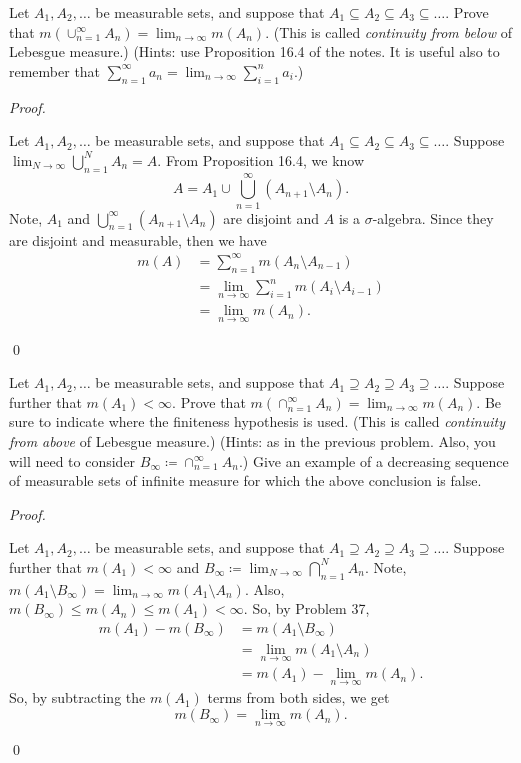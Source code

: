 \documentclass[12pt]{article}
\newenvironment{problem}[2][Problem]{\begin{trivlist}
\item[\hskip \labelsep {\bfseries #1}\hskip \labelsep {\bfseries
#2.}]}{\end{trivlist}}
\newenvironment{sol}
    {\emph{Proof.}
    }
    {
    \qed
    }
\begin{document}
  \begin{problem}{37}
    Let $A_1,A_2,\dots$ be measurable sets, and suppose that $A_1 \subseteq A_2 \subseteq A_3 \subseteq \dots$. Prove that $m(\cup _{n = 1}^{\infty}A_n) = \lim_{n \to \infty}m(A_n)$. (This is called \textit{continuity from below} of Lebesgue measure.) (Hints: use Proposition 16.4 of the notes. It is useful also to remember that $\sum_{n = 1}^{\infty}a_n = \lim_{n \to \infty}\sum_{i = 1}^{n}a_i$.)
  \end{problem}
  \begin{sol}
    Let $A_1,A_2,\dots$ be measurable sets, and suppose that $A_1 \subseteq A_2 \subseteq A_3 \subseteq \dots$. Suppose $\lim_{N \to \infty} \bigcup_{n = 1}^NA_n = A$. From Proposition 16.4, we know $$A = A_1 \cup \bigcup_{n = 1}^{\infty}(A_{n+1}  \setminus A_n).$$ Note, $A_1$ and $\bigcup_{n = 1}^{\infty}(A_{n+1}  \setminus A_n)$ are disjoint and $A$ is a $\sigma$-algebra. Since they are disjoint and measurable, then we have 
    \begin{align*}
      m(A) &= \sum_{n = 1}^{\infty}m(A_n \setminus A_{n-1}) \\
      &= \lim_{n \to \infty} \sum_{i = 1}^n m(A_i \setminus A_{i - 1}) \\
      &= \lim_{n \to \infty} m(A_n).
    \end{align*}
  \end{sol}
  
  \begin{problem}{38}
    Let $A_1,A_2,\dots$ be measurable sets, and suppose that $A_1 \supseteq A_2 \supseteq A_3 \supseteq \dots$. Suppose further that $m(A_1) < \infty$. Prove that $m(\cap_{n = 1}^{\infty}A_n) = \lim_{n \to \infty}m(A_n)$. Be sure to indicate where the finiteness hypothesis is used. (This is called \textit{continuity from above} of Lebesgue measure.) (Hints: as in the previous problem. Also, you will need to consider $B_{\infty} \coloneqq \cap_{n = 1}^{\infty}A_n$.) Give an example of a decreasing sequence of measurable sets of infinite measure for which the above conclusion is false. 
  \end{problem}
  \begin{sol}
    Let $A_1,A_2,\dots$ be measurable sets, and suppose that $A_1 \supseteq A_2 \supseteq A_3 \supseteq \dots$. Suppose further that $m(A_1) < \infty$ and $B_{\infty} \coloneqq \lim_{N \to \infty}\bigcap_{n = 1}^NA_n$. Note, $m(A_1 \setminus B_{\infty}) = \lim_{n \to \infty}m(A_1 \setminus A_n)$. Also, $m(B_{\infty}) \leq m(A_n) \leq m(A_1) < \infty$. So, by Problem 37, 
    \begin{align*}
      m(A_1) - m(B_{\infty}) &= m(A_1 \setminus B_{\infty}) \\
      &= \lim_{n \to \infty} m(A_1 \setminus A_n) \\
      &= m(A_1) - \lim_{n \to \infty} m(A_n).
    \end{align*}
    So, by subtracting the $m(A_1)$ terms from both sides, we get $$m(B_{\infty}) = \lim_{n \to \infty}m(A_n).$$
  \end{sol}
  
\end{document}
